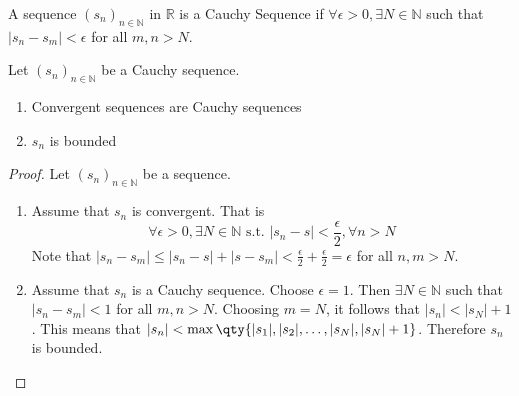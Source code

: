 \documentclass[../notes.tex]{subfiles}
\begin{document}
\begin{definition}
    A sequence $(s_n)_{n\in \mathbb{N}}$ in $\mathbb{R}$ is a Cauchy Sequence if $\forall \epsilon > 0, \exists N \in \mathbb{N}$ such that $|s_n - s_m| < \epsilon$ for all $m,n > N$.
\end{definition}
\begin{theorem}
    \label{thm:cauchyproperties}
    Let $(s_n)_{n\in \mathbb{N}}$ be a Cauchy sequence.
    \begin{enumerate}
        \item Convergent sequences are Cauchy sequences
        \item $s_n$ is bounded
    \end{enumerate}
\end{theorem}

\begin{proof}
    Let $(s_n)_{n\in \mathbb{N}}$ be a sequence.
    \begin{enumerate}
        \item %
        Assume that $s_n$ is convergent. That is
        \[
            \forall \epsilon > 0, \exists N \in \mathbb{N} \text{ s.t. } |s_n - s| < \frac{\epsilon}{2}, \forall n > N
        \]
        Note that $|s_n - s_m| \leq |s_n - s| + |s - s_m| < \frac{\epsilon}{2} + \frac{\epsilon}{2} = \epsilon$ for all $n, m > N$.
        \item %
        Assume that $s_n$ is a Cauchy sequence. Choose $\epsilon = 1$. Then $\exists N \in \mathbb{N}$ such that $|s_n - s_m| < 1$ for all $m,n > N$. Choosing $m = N$, it follows that $|s_n| < |s_N| + 1$. This means that $|s_n| < \max\qty{|s_1|, |s_2|, \ldots, |s_N|, |s_N| + 1}$. Therefore $s_n$ is bounded.
    \end{enumerate}
\end{proof}
\end{document}
